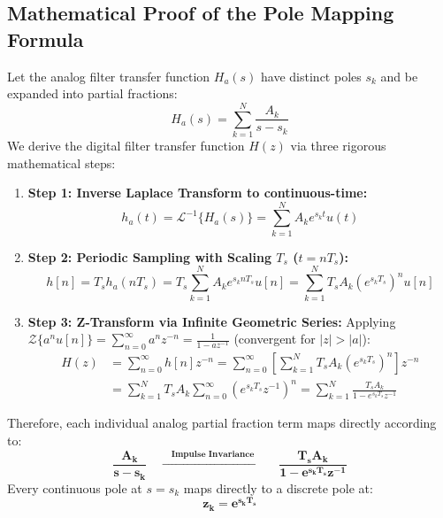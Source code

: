 \documentclass[11pt,a4paper]{article}
\begin{document}
\subsection{Mathematical Proof of the Pole Mapping Formula}
Let the analog filter transfer function $H_a(s)$ have distinct poles $s_k$ and be expanded into partial fractions:
\begin{equation}
H_a(s) = \sum_{k=1}^N \frac{A_k}{s - s_k}
\end{equation}
We derive the digital filter transfer function $H(z)$ via three rigorous mathematical steps:
\begin{enumerate}
    \item \textbf{Step 1: Inverse Laplace Transform to continuous-time:}
    \begin{equation}
    h_a(t) = \mathcal{L}^{-1}\{H_a(s)\} = \sum_{k=1}^N A_k e^{s_k t} u(t)
    \end{equation}
    \item \textbf{Step 2: Periodic Sampling with Scaling $T_s$ ($t = n T_s$):}
    \begin{equation}
    h[n] = T_s h_a(n T_s) = T_s \sum_{k=1}^N A_k e^{s_k n T_s} u[n] = \sum_{k=1}^N T_s A_k \left(e^{s_k T_s}\right)^n u[n]
    \end{equation}
    \item \textbf{Step 3: Z-Transform via Infinite Geometric Series:}
    Applying $\mathcal{Z}\{a^n u[n]\} = \sum_{n=0}^\infty a^n z^{-n} = \frac{1}{1 - a z^{-1}}$ (convergent for $|z| > |a|$):
    \begin{align}
    H(z) &= \sum_{n=0}^\infty h[n] z^{-n} = \sum_{n=0}^\infty \left[ \sum_{k=1}^N T_s A_k \left(e^{s_k T_s}\right)^n \right] z^{-n} \nonumber \\
    &= \sum_{k=1}^N T_s A_k \sum_{n=0}^\infty \left(e^{s_k T_s} z^{-1}\right)^n = \sum_{k=1}^N \frac{T_s A_k}{1 - e^{s_k T_s} z^{-1}}
    \end{align}
\end{enumerate}
Therefore, each individual analog partial fraction term maps directly according to:
\begin{equation}
\mathbf{\frac{A_k}{s - s_k} \quad \xrightarrow{\quad \text{Impulse Invariance} \quad} \quad \frac{T_s A_k}{1 - e^{s_k T_s} z^{-1}}}
\label{eq:master_ii}
\end{equation}
Every continuous pole at $s = s_k$ maps directly to a discrete pole at:
\begin{equation}
\mathbf{z_k = e^{s_k T_s}}
\end{equation}
\end{document}
